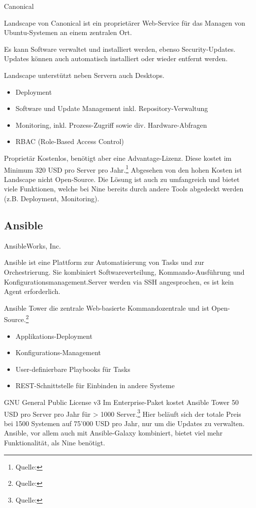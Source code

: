{Canonical}
{Landscape von Canonical ist ein proprietärer Web-Service für das Managen von Ubuntu-Systemen an einem zentralen Ort.

Es kann Software verwaltet und installiert werden, ebenso Security-Updates. Updates können auch automatisch installiert oder wieder entfernt werden.

Landscape unterstützt neben Servern auch Desktops.}
{\begin{itemize}
\item Deployment
\item Software und Update Management inkl. Repository-Verwaltung
\item Monitoring, inkl. Prozess-Zugriff sowie div. Hardware-Abfragen
\item RBAC (Role-Based Access Control)
\end{itemize}}
{Proprietär}
{Kostenlos, benötigt aber eine Advantage-Lizenz. Diese kostet im Minimum 320 USD pro Server pro Jahr.\footnote{Quelle: }}
{}
{Abgesehen von den hohen Kosten ist Landscape nicht Open-Source. Die Lösung ist auch zu umfangreich und bietet viele Funktionen, welche bei Nine bereits durch andere Tools abgedeckt werden (z.B. Deployment, Monitoring).}

\subsection{Ansible}

{AnsibleWorks, Inc.}
{Ansible ist eine Plattform zur Automatisierung von Tasks und zur Orchestrierung. Sie kombiniert Softwareverteilung, Kommando-Ausführung und Konfigurationsmanagement.Server werden via SSH angesprochen, es ist kein Agent erforderlich.

Ansible Tower die zentrale Web-basierte Kommandozentrale und ist Open-Source.\footnote{Quelle: }}
{\begin{itemize}
\item Applikations-Deployment
\item Konfigurations-Management
\item User-definierbare Playbooks für Tasks
\item REST-Schnittstelle für Einbinden in andere Systeme
\end{itemize}}
{GNU General Public License v3}
{Im Enterprise-Paket kostet Ansible Tower 50 USD pro Server pro Jahr für > 1000 Server.\footnote{Quelle: }}
{}
{Hier beläuft sich der totale Preis bei 1500 Systemen auf 75'000 USD pro Jahr, nur um die Updates zu verwalten. Ansible, vor allem auch mit Ansible-Galaxy kombiniert, bietet viel mehr Funktionalität, als Nine benötigt.}

